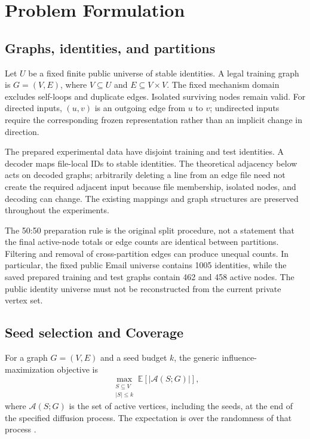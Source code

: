 \chapter{Problem Formulation}\label{ch:problem}
\section{Graphs, identities, and partitions}
Let $U$ be a fixed finite public universe of stable identities. A legal training graph is $G=(V,E)$, where $V\subseteq U$ and $E\subseteq V\times V$. The fixed mechanism domain excludes self-loops and duplicate edges. Isolated surviving nodes remain valid. For directed inputs, $(u,v)$ is an outgoing edge from $u$ to $v$; undirected inputs require the corresponding frozen representation rather than an implicit change in direction.

The prepared experimental data have disjoint training and test identities. A decoder maps file-local IDs to stable identities. The theoretical adjacency below acts on decoded graphs; arbitrarily deleting a line from an edge file need not create the required adjacent input because file membership, isolated nodes, and decoding can change. The existing mappings and graph structures are preserved throughout the experiments.

The 50:50 preparation rule is the original split procedure, not a statement that the final active-node totals or edge counts are identical between partitions. Filtering and removal of cross-partition edges can produce unequal counts. In particular, the fixed public Email universe contains 1005 identities, while the saved prepared training and test graphs contain 462 and 458 active nodes. The public identity universe must not be reconstructed from the current private vertex set.

\section{Seed selection and Coverage}
For a graph $G=(V,E)$ and a seed budget $k$, the generic influence-maximization objective is
\begin{equation}
 \max_{\substack{S\subseteq V\\ |S|\leq k}}
 \mathbb{E}\!\left[|\mathcal{A}(S;G)|\right],
 \label{eq:im-objective}
\end{equation}
where $\mathcal{A}(S;G)$ is the set of active vertices, including the seeds, at the end of the specified diffusion process. The expectation is over the randomness of that process \cite{kempe2003}.

